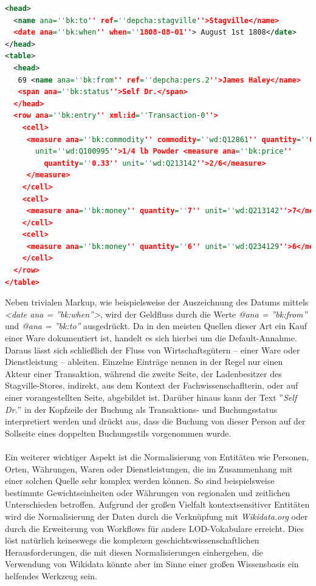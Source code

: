 \documentclass[12pt,a4paper]{article}
\begin{document}
\begin{lstlisting}[language=XML]
<head> 
  <name ana=''bk:to'' ref=''depcha:stagville''>Stagville</name> 
  <date ana=''bk:when'' when=''1808-08-01''> August 1st 1808</date>
</head> 
<table>
  <head>
   69 <name ana=''bk:from'' ref=''depcha:pers.2''>James Haley</name> 
   <span ana=''bk:status''>Self Dr.</span> 
  </head> 
  <row ana=''bk:entry'' xml:id=''Transaction-0''> 
    <cell> 
     <measure ana=''bk:commodity'' commodity=''wd:Q12861'' quantity=''0.25'' 
       unit=''wd:Q100995''>1/4 lb Powder <measure ana=''bk:price'' 
         quantity=''0.33'' unit=''wd:Q213142''>2/6</measure>
     </measure>
    </cell> 
    <cell> 
     <measure ana=''bk:money'' quantity=''7'' unit=''wd:Q213142''>7</measure>
    </cell>
    <cell> 
     <measure ana=''bk:money'' quantity=''6'' unit=''wd:Q234129''>6</measure>
    </cell>
  </row>
</table>
\end{lstlisting}
Neben trivialen Markup, wie beispielsweise der Auszeichnung des Datums mittels
\textit{<date ana = ''bk:when''>}, wird der Geldfluss durch die Werte \textit{@ana = ''bk:from''} und \textit{@ana = ''bk:to''} ausgedrückt. Da in den meisten Quellen dieser Art ein Kauf einer Ware dokumentiert ist, handelt es sich hierbei um die Default-Annahme. Daraus lässt sich schließlich der Fluss von Wirtschaftsgütern -- einer Ware oder Dienstleistung -- ableiten. Einzelne Einträge nennen in der Regel nur einen Akteur einer Transaktion, während die zweite Seite, der Ladenbesitzer des Stagville-Stores, indirekt, aus dem Kontext der Fachwissenschaflterin, oder auf einer vorangestellten Seite, abgebildet ist. Darüber hinaus kann der Text ''\textit{Self Dr.}'' in der Kopfzeile der Buchung als Transaktions- und Buchungsstatus interpretiert werden und drückt aus, dass die Buchung von dieser Person auf der Sollseite eines doppelten Buchungsstils vorgenommen wurde.
\\
\\
Ein weiterer wichtiger Aspekt ist die Normalisierung von Entitäten wie Personen, Orten, Währungen, Waren oder Dienstleistungen, die im Zusammenhang mit einer solchen Quelle sehr komplex werden können. So sind beispielsweise bestimmte Gewichtseinheiten oder Währungen von regionalen und zeitlichen Unterschieden betroffen. Aufgrund der großen Vielfalt kontextsensitiver Entitäten wird die Normalisierung der Daten durch die Verknüpfung mit \textit{Wikidata.org} oder durch die Erweiterung von Workflows für andere LOD-Vokabulare erreicht. Dies löst natürlich keineswegs die komplexen geschichtswissenschaftlichen Herausforderungen, die mit diesen Normalisierungen einhergehen, die Verwendung von Wikidata könnte aber im Sinne einer großen Wissensbasis ein helfendes Werkzeug sein.
\end{document}
